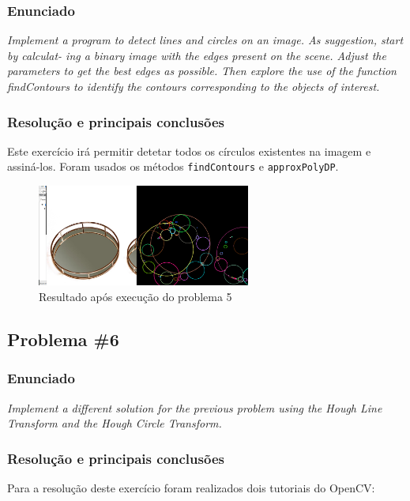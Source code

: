 \documentclass[portuguese, times, mirror]{revdetua}
\begin{document}
\subsubsection{Enunciado}
\textit{Implement a program to detect lines and circles on an image. As suggestion, start by calculat-
ing a binary image with the edges present on the scene. Adjust the parameters to get the best
edges as possible. Then explore the use of the function findContours to identify the contours
corresponding to the objects of interest.}

\subsubsection{Resolução e principais conclusões}

Este exercício irá permitir detetar todos os círculos existentes na imagem e assiná-los. Foram usados os métodos \texttt{findContours} e \texttt{approxPolyDP}. 



\begin{figure}[ht!]
\centering
\includegraphics[width=70mm]{img/ex5.png}
\caption{Resultado após execução do problema 5 }
\end{figure}

\subsection{Problema \#6}

\subsubsection{Enunciado}
\textit{Implement a different solution for the previous problem using the Hough Line Transform and the Hough Circle Transform.}

\subsubsection{Resolução e principais conclusões}

Para a resolução deste exercício foram realizados dois tutoriais do OpenCV: 
\end{document}
